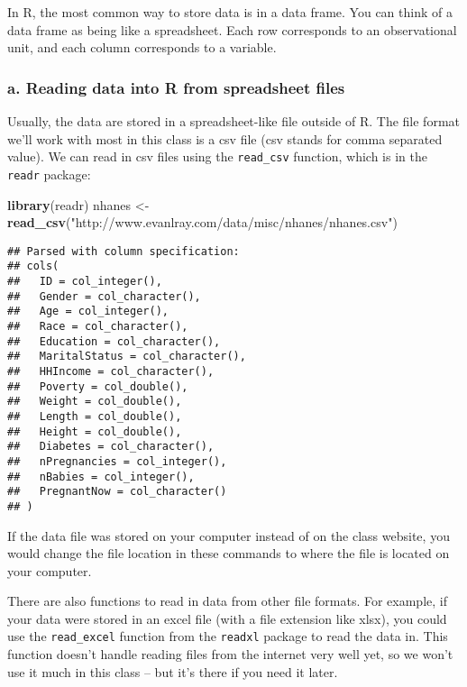 \documentclass[]{article}
\newenvironment{Shaded}{\begin{snugshade}}{\end{snugshade}}
\newcommand{\KeywordTok}[1]{\textcolor[rgb]{0.13,0.29,0.53}{\textbf{#1}}}
\newcommand{\StringTok}[1]{\textcolor[rgb]{0.31,0.60,0.02}{#1}}
\newcommand{\NormalTok}[1]{#1}
\begin{document}
In R, the most common way to store data is in a data frame. You can
think of a data frame as being like a spreadsheet. Each row corresponds
to an observational unit, and each column corresponds to a variable.

\subsubsection{a. Reading data into R from spreadsheet
files}\label{a.-reading-data-into-r-from-spreadsheet-files}

Usually, the data are stored in a spreadsheet-like file outside of R.
The file format we'll work with most in this class is a csv file (csv
stands for comma separated value). We can read in csv files using the
\texttt{read\_csv} function, which is in the \texttt{readr} package:

\begin{Shaded}
\begin{Highlighting}[]
\KeywordTok{library}\NormalTok{(readr)}
\NormalTok{nhanes <-}\StringTok{ }\KeywordTok{read_csv}\NormalTok{(}\StringTok{"http://www.evanlray.com/data/misc/nhanes/nhanes.csv"}\NormalTok{)}
\end{Highlighting}
\end{Shaded}

\begin{verbatim}
## Parsed with column specification:
## cols(
##   ID = col_integer(),
##   Gender = col_character(),
##   Age = col_integer(),
##   Race = col_character(),
##   Education = col_character(),
##   MaritalStatus = col_character(),
##   HHIncome = col_character(),
##   Poverty = col_double(),
##   Weight = col_double(),
##   Length = col_double(),
##   Height = col_double(),
##   Diabetes = col_character(),
##   nPregnancies = col_integer(),
##   nBabies = col_integer(),
##   PregnantNow = col_character()
## )
\end{verbatim}

If the data file was stored on your computer instead of on the class
website, you would change the file location in these commands to where
the file is located on your computer.

There are also functions to read in data from other file formats. For
example, if your data were stored in an excel file (with a file
extension like xlsx), you could use the \texttt{read\_excel} function
from the \texttt{readxl} package to read the data in. This function
doesn't handle reading files from the internet very well yet, so we
won't use it much in this class -- but it's there if you need it later.
\end{document}
